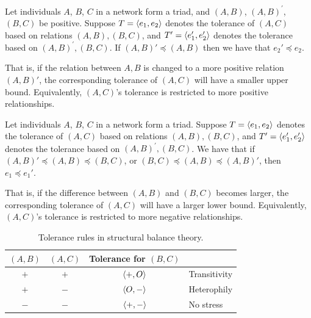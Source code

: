 \begin{principle}
Let individuals $A$, $B$, $C$ in a network form a triad, and $(A,B)$,
$(A,B)^{'}$, $(B,C)$ be positive. Suppose $T=\langle e_1,e_2\rangle$ denotes
the tolerance of $(A,C)$ based on relations $(A,B),(B,C)$, and
$T'=\langle e_1',e_2'\rangle$ denotes the tolerance based on
$(A,B)^{'},(B,C)$. If $(A,B)' \preceq (A,B)$ then we have that
$e_2'\preceq e_2$.
\end{principle}{\label{ref:transitivity}
That is, if the relation between $A, B$ is changed to a more positive relation $(A,B)'$, the corresponding tolerance of $(A,C)$ will have a smaller upper bound. Equivalently, $(A,C)$'s tolerance is restricted to more positive relationships.
\begin{principle}  
Let individuals $A$, $B$, $C$ in a network form a triad. Suppose
$T=\langle e_1,e_2\rangle$ denotes the tolerance of $(A,C)$ based on
relations $(A,B),(B,C)$, and $T'=\langle e_1',e_2'\rangle$ denotes the
tolerance based on $(A,B)^{'},(B,C)$. We have that if
$(A,B)' \preceq (A,B) \preceq (B,C)$, or $ (B,C) \preceq (A,B) \preceq
(A,B)'$, then $e_1\preceq e_1'$.
\end{principle}
That is, if the difference between $(A,B)$ and $(B,C)$ becomes larger, the corresponding tolerance of $(A,C)$ will have a larger lower bound. Equivalently, $(A,C)$'s tolerance is restricted to more negative relationships.
\begin{table}[h]
\begin{center}
\caption{\label{ref:classic_balance}Tolerance rules in structural balance theory.}
 \begin{tabular}{cc|cl} 
  $(A,B)$ & $(A,C)$ & Tolerance for $(B,C)$ &  \\ \hline
  $+$ & $+$ & $\langle +,O\rangle$ & Transitivity \\
  $+$ & $-$ & $\langle O,-\rangle$ & Heterophily \\ 
  $-$ & $-$ & $\langle +,-\rangle$ & No stress \\ 
 \end{tabular}\\\vspace{4mm}
\end{center}
\end{table}

}
